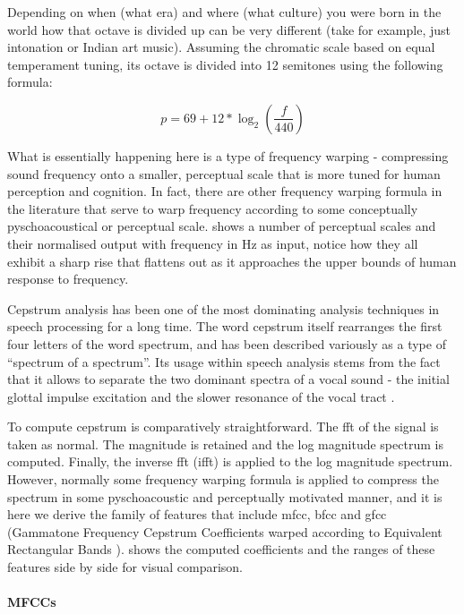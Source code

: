 {{Depending on when (what era) and where (what culture) you were born in the world how that octave is divided up can be very different (take for example, just intonation or Indian art music). Assuming the chromatic scale based on equal temperament tuning, its octave is divided into 12 semitones using the following formula:

\begin{equation}
\label{eq:High Frequency Content}	
p = 69 + 12 * \log_2(\frac{f}{440})
\end{equation}

What is essentially happening here is a type of frequency warping - compressing sound frequency onto a smaller, perceptual scale that is more tuned for human perception and cognition. In fact, there are other frequency warping formula in the literature that serve to warp frequency according to some conceptually pyschoacoustical or perceptual scale.  shows a number of perceptual scales and their normalised output with frequency in Hz as input, notice how they all exhibit a sharp rise that flattens out as it approaches the upper bounds of human response to frequency.

Cepstrum analysis has been one of the most dominating analysis techniques in speech processing for a long time. The word cepstrum itself rearranges the first four letters of the word spectrum, and has been described variously as a type of ``spectrum of a spectrum''. Its usage within speech analysis stems from the fact that it allows to separate the two dominant spectra of a vocal sound - the initial glottal impulse excitation and the slower resonance of the vocal tract \citep{Roads1996, Kim2006}.

To compute cepstrum is comparatively straightforward. The \acrshort{fft} of the signal is taken as normal. The magnitude is retained and the log magnitude spectrum is computed. Finally, the inverse \acrshort{fft} (\acrshort{ifft}) is applied to the log magnitude spectrum. However, normally some frequency warping formula is applied to compress the spectrum in some pyschoacoustic and perceptually motivated manner, and it is here we derive the family of features that include \acrfull{mfcc}, \acrfull{bfcc} and \acrshort{gfcc} (Gammatone Frequency Cepstrum Coefficients warped according to Equivalent Rectangular Bands \citep{Shao2009}).  shows the computed coefficients and the ranges of these features side by side for visual comparison.

\paragraph{MFCCs}

}}
